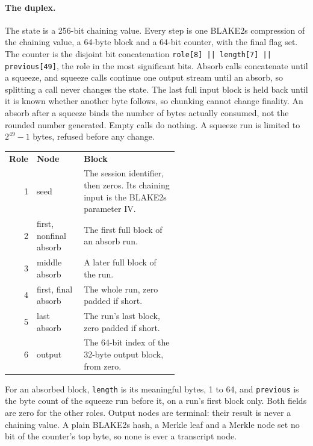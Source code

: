 \paragraph{The duplex.} The state is a 256-bit chaining value. Every step is one BLAKE2s compression of the chaining value, a 64-byte block and a 64-bit counter, with the final flag set. The counter is the disjoint bit concatenation \texttt{role[8] || length[7] || previous[49]}, the role in the most significant bits. Absorb calls concatenate until a squeeze, and squeeze calls continue one output stream until an absorb, so splitting a call never changes the state. The last full input block is held back until it is known whether another byte follows, so chunking cannot change finality. An absorb after a squeeze binds the number of bytes actually consumed, not the rounded number generated. Empty calls do nothing. A squeeze run is limited to $2^{49}-1$ bytes, refused before any change.

\begin{center}
\begin{tabular}{r l p{0.56\linewidth}}
\textbf{Role} & \textbf{Node} & \textbf{Block} \\
1 & seed & The session identifier, then zeros. Its chaining input is the BLAKE2s parameter IV. \\
2 & first, nonfinal absorb & The first full block of an absorb run. \\
3 & middle absorb & A later full block of the run. \\
4 & first, final absorb & The whole run, zero padded if short. \\
5 & last absorb & The run's last block, zero padded if short. \\
6 & output & The 64-bit index of the 32-byte output block, from zero. \\
\end{tabular}
\end{center}

For an absorbed block, \texttt{length} is its meaningful bytes, 1 to 64, and \texttt{previous} is the byte count of the squeeze run before it, on a run's first block only. Both fields are zero for the other roles. Output nodes are terminal: their result is never a chaining value. A plain BLAKE2s hash, a Merkle leaf and a Merkle node set no bit of the counter's top byte, so none is ever a transcript node.

